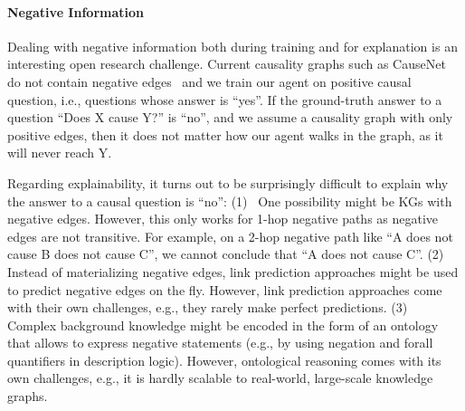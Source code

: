 \paragraph{Negative Information} Dealing with negative information both during training and for explanation is an interesting open research challenge. Current causality graphs such as CauseNet do not contain negative edges~\cite{Heindorf2020Causenet} and we train our agent on positive causal question, i.e., questions whose answer is ``yes''.  If the ground-truth answer to a question ``Does X cause Y?'' is ``no'',
and we assume a causality graph with only positive edges,
then it does not matter how our agent walks in the graph, as it will never reach Y.

Regarding explainability, it turns out to be surprisingly difficult to explain why the answer to a causal question is ``no'':
(1)~
One possibility might be KGs with negative edges. However, this only works for 1-hop negative paths as negative edges are not transitive. For example, on a 2-hop negative path like ``A does not cause B does not cause C'', we cannot conclude that ``A does not cause C''.
(2)~
Instead of materializing negative edges, link prediction approaches might be used to predict negative edges on the fly. However, link prediction approaches come with their own challenges, e.g., they rarely make perfect predictions.
(3)~
Complex background knowledge might be encoded in the form of an ontology that allows to express negative statements (e.g., by using negation and forall quantifiers in description logic). However, ontological reasoning comes with its own challenges, e.g., it is hardly scalable to real-world, large-scale knowledge graphs.
